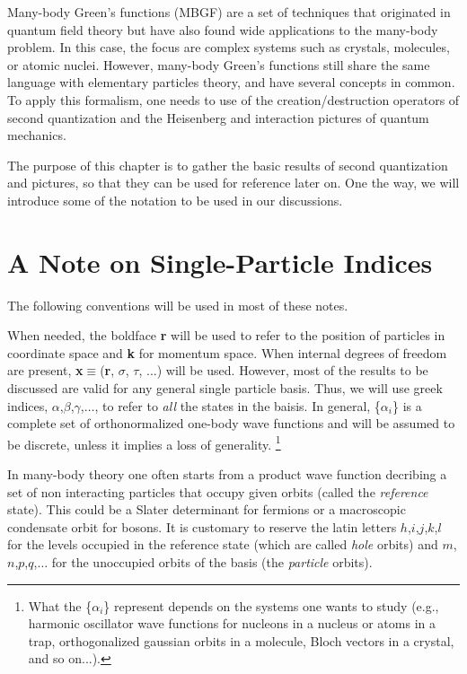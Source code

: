 Many-body Green's functions (MBGF) are a set of techniques that originated in quantum field theory but have also found wide applications to the many-body problem. In this case, the focus are complex systems such as crystals, molecules, or atomic nuclei. However, many-body Green's functions still share the same language with elementary particles theory, and have several concepts in common.
To apply this formalism, one needs to use of the creation/destruction operators of second quantization and the Heisenberg and interaction pictures of quantum mechanics.

The purpose of this chapter is to gather the basic results of second quantization and pictures, so that they can be used for reference later on.
One the way, we will introduce some of the notation to be used in our discussions.
%
%




\section{A Note on Single-Particle Indices}

The following conventions will be used in most of these notes.

When needed, the boldface {\bf r} will be used to refer to the position of particles in coordinate space and {\bf k} for momentum space. When internal degrees of freedom are present, {\bf x}$\equiv$({\bf r}, $\sigma$, $\tau$, ...) will be used.
%
However, most of the results to be discussed are valid for any general single particle basis. Thus, we will use greek indices, $\alpha$,$\beta$,$\gamma$,$\ldots$, to refer to {\em all} the states in the baisis.
%
In general, \{$\alpha_i$\} is a complete set of orthonormalized one-body wave functions and will be assumed to be discrete, unless it implies a loss of generality.%
\footnote{What the \{$\alpha_i$\} represent depends on the systems one wants to study (e.g., harmonic oscillator wave functions for nucleons in a nucleus or atoms in a trap, orthogonalized gaussian orbits in a molecule, Bloch vectors in a crystal, and so on...).}

In many-body theory one often starts from a product wave function decribing a set of non interacting particles that occupy given orbits (called the {\em reference} state). This could be a Slater determinant for fermions or a macroscopic condensate orbit for bosons.
 It is customary to reserve the latin letters $h$,$i$,$j$,$k$,$l$ for the levels occupied in the reference state (which are called {\em hole} orbits) and $m$,$n$,$p$,$q$,$\ldots$ for the unoccupied orbits of the basis (the {\em particle} orbits).


